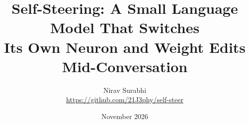 \documentclass[11pt]{article}
\title{\textbf{Self-Steering: A Small Language Model That Switches\\Its Own Neuron and Weight Edits Mid-Conversation}}
\author{Nirav Surabhi\\\small\url{https://github.com/21J3phy/self-steer}}
\date{November 2026}
\begin{document}
\maketitle

\begin{abstract}

\end{abstract}


\end{document}
